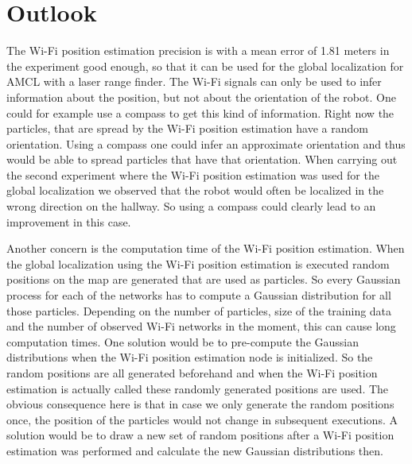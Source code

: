 \chapter{Outlook} %
\label{Chapter6}

The Wi-Fi position estimation precision is with a mean error of 1.81 meters in the experiment good enough, so that it can be used for the global localization for AMCL with a laser range finder. The Wi-Fi signals can only be used to infer information about the position, but not about the orientation of the robot. One could for example use a compass to get this kind of information. Right now the particles, that are spread by the Wi-Fi position estimation have a random orientation. Using a compass one could infer an approximate orientation and thus would be able to spread particles that have that orientation. When carrying out the second experiment where the Wi-Fi position estimation was used for the global localization we observed that the robot would often be localized in the wrong direction on the hallway. So using a compass could clearly lead to an improvement in this case. 

Another concern is the computation time of the Wi-Fi position estimation. When the global localization using the Wi-Fi position estimation is executed random positions on the map are generated that are used as particles. So every Gaussian process for each of the networks has to compute a Gaussian distribution for all those particles. Depending on the number of particles, size of the training data and the number of observed Wi-Fi networks in the moment, this can cause long computation times. One solution would be to pre-compute the Gaussian distributions when the Wi-Fi position estimation node is initialized. So the random positions are all generated beforehand and when the Wi-Fi position estimation is actually called these randomly generated positions are used. The obvious consequence here is that in case we only generate the random positions once, the position of the particles would not change in subsequent executions. A solution would be to draw a new set of random positions after a Wi-Fi position estimation was performed and calculate the new Gaussian distributions then. 

